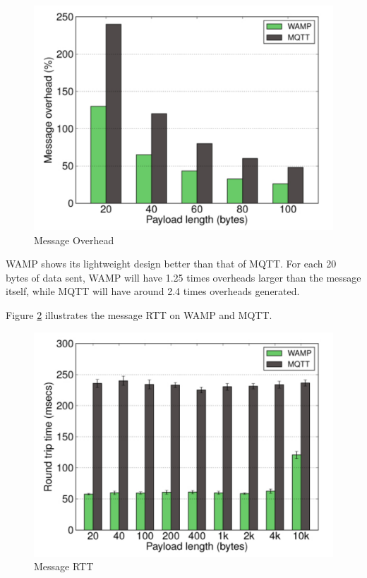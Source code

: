 \begin{figure}[ht]
  \begin{center}
    \includegraphics[width=1\textwidth]{images/overhead.pdf}
    \caption{Message Overhead}
    \label{fig:overhead}
  \end{center}
\end{figure}

WAMP shows its lightweight design better than that of MQTT. For each 20 bytes of data sent, WAMP will have 1.25 times overheads larger than the message itself, while MQTT will have around 2.4 times overheads generated. 

Figure \ref{fig:rtt} illustrates the message RTT on WAMP and MQTT.

\begin{figure}[ht]
  \begin{center}
    \includegraphics[width=1\textwidth]{images/rtt.pdf}
    \caption{Message RTT}
    \label{fig:rtt}
  \end{center}
\end{figure}

